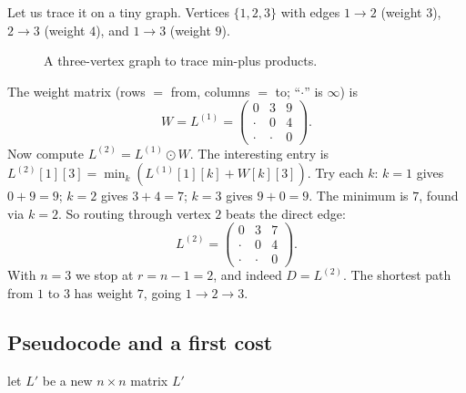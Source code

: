 \begin{labbox}
Let us trace it on a tiny graph. Vertices $\{1,2,3\}$ with edges
$1 \to 2$ (weight $3$), $2 \to 3$ (weight $4$), and $1 \to 3$ (weight $9$).

\begin{figure}[H]
\centering
{}
\caption{A three-vertex graph to trace min-plus products.}
\label{ch25:fig-lab1}
\end{figure}

The weight matrix (rows $=$ from, columns $=$ to; ``$\cdot$'' is $\infty$) is
\[
W = L^{(1)} =
\begin{pmatrix}
0 & 3 & 9\\
\cdot & 0 & 4\\
\cdot & \cdot & 0
\end{pmatrix}.
\]
Now compute $L^{(2)} = L^{(1)} \odot W$. The interesting entry is
$L^{(2)}[1][3] = \min_k (L^{(1)}[1][k] + W[k][3])$. Try each $k$:
$k=1$ gives $0 + 9 = 9$; $k=2$ gives $3 + 4 = 7$; $k=3$ gives $9 + 0 = 9$.
The minimum is $7$, found via $k = 2$. So routing through vertex $2$ beats the
direct edge:
\[
L^{(2)} =
\begin{pmatrix}
0 & 3 & 7\\
\cdot & 0 & 4\\
\cdot & \cdot & 0
\end{pmatrix}.
\]
With $n = 3$ we stop at $r = n-1 = 2$, and indeed $D = L^{(2)}$. The shortest
path from $1$ to $3$ has weight $7$, going $1 \to 2 \to 3$.
\end{labbox}

\subsection{Pseudocode and a first cost}

\begin{algorithm}[H]
\caption{\textsc{Extend-Shortest-Paths}($L$, $W$) -- one min-plus product}
let $L'$ be a new $n \times n$ matrix\;
\Return $L'$\;
\end{algorithm}

